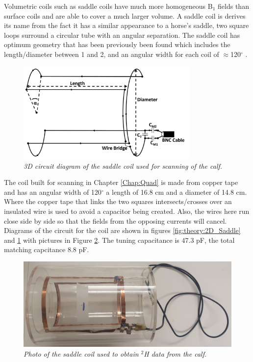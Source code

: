 \documentclass[class=article, crop=false]{standalone}
\begin{document}
Volumetric coils such as saddle coils have much more homogeneous B$_1$ fields than surface coils and are able to cover a much larger volume. A saddle coil is derives its name from the fact it has a similar appearance to a horse's saddle, two square loops surround a circular tube with an angular separation. The saddle coil has optimum geometry that has been previously been found which includes the length/diameter between 1 and 2, and an angular width for each coil of $\approx$120$^\circ$ \cite{Ginsberg1970OptimumField,Salmon2006OptimizationImaging}.

\begin{figure}
    \centering
    \includegraphics[width=0.8\textwidth]{Figures/Theory/3D_Saddle.png}
    \caption{\textit{3D circuit diagram of the saddle coil used for scanning of the calf.}}
    \label{fig:theory:3D_Saddle}
\end{figure}

The coil built for scanning in Chapter \ref{Chap:Quad} is made from copper tape and has an angular width of 120$^\circ$ a length of 16.8 cm and a diameter of 14.8 cm. Where the copper tape that links the two squares intersects/crosses over an insulated wire is used to avoid a capacitor being created. Also, the wires here run close side by side so that the fields from the opposing currents will cancel. Diagrams of the circuit for the coil are shown in figures \ref{fig:theory:2D_Saddle} and \ref{fig:theory:3D_Saddle} with pictures in Figure \ref{fig:theory:Saddle_pic}. The tuning capacitance is 47.3 pF, the total matching capcitance 8.8 pF.

\begin{figure}
    \centering
    \includegraphics[width=1\textwidth]{Figures/Theory/Saddle_Coil.jpg}
    \caption{\textit{Photo of the saddle coil used to obtain $^2$H data from the calf.}}
    \label{fig:theory:Saddle_pic}
\end{figure}
\end{document}
